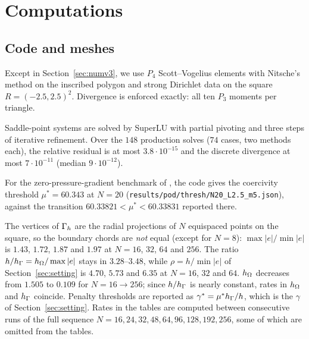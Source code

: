 \section{Computations}\label{sec:numerics}

\subsection{Code and meshes}
Except in Section~\ref{sec:numv3}, we use $P_4$ Scott--Vogelius elements with Nitsche's method on the inscribed polygon and strong Dirichlet data on the square $R=(-2.5,2.5)^2$. Divergence is enforced exactly: all ten $P_3$ moments per triangle.

Saddle-point systems are solved by SuperLU \cite{SuperLU} with partial pivoting and three steps of iterative refinement. Over the $148$ production solves ($74$ cases, two methods each), the relative residual is at most $3.8\cdot10^{-15}$ and the discrete divergence at most $7\cdot10^{-11}$ (median $9\cdot10^{-12}$).

For the zero-pressure-gradient benchmark of \cite{Cavalcante}, the code gives the coercivity threshold $\mu^\ast=60.343$ at $N=20$ (\texttt{results/pod/thresh/}\allowbreak\texttt{N20\_L2.5\_m5.json}), against the transition $60.33821<\mu^\ast<60.33831$ reported there.

The vertices of $\Gamma_h$ are the radial projections of $N$ equispaced points on the square, so the boundary chords are \emph{not} equal (except for $N=8$): $\max|e|/\min|e|$ is $1.43$, $1.72$, $1.87$ and $1.97$ at $N=16$, $32$, $64$ and $256$. The ratio $h/h_\Gamma=h_\Omega/\max|e|$ stays in $3.28$--$3.48$, while $\rho=h/\min|e|$ of Section~\ref{sec:setting} is $4.70$, $5.73$ and $6.35$ at $N=16$, $32$ and $64$. $h_\Omega$ decreases from $1.505$ to $0.109$ for $N=16\to256$; since $h/h_\Gamma$ is nearly constant, rates in $h_\Omega$ and $h_\Gamma$ coincide. Penalty thresholds are reported as $\gamma^\ast=\mu^\ast h_\Gamma/h$, which is the $\gamma$ of Section~\ref{sec:setting}. Rates in the tables are computed between consecutive runs of the full sequence $N=16,24,32,48,64,96,128,192,256$, some of which are omitted from the tables.

